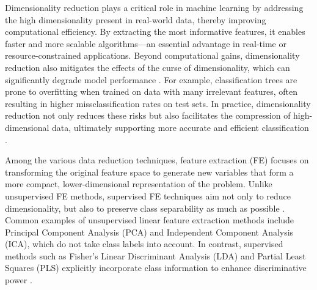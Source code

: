 \documentclass[11pt,a4paper]{article}
\begin{document}
Dimensionality reduction plays a critical role in machine learning by addressing the high dimensionality present in real-world data, thereby improving computational efficiency. By extracting the most informative features, it enables faster and more scalable algorithms---an essential advantage in real-time or resource-constrained applications.
Beyond computational gains, dimensionality reduction also mitigates the effects of the curse of dimensionality, which can significantly degrade model performance \citep{hu2024tackling}. For example, classification trees are prone to overfitting when trained on data with many irrelevant features, often resulting in higher missclassification rates on test sets.
In practice, dimensionality reduction not only reduces these risks but also facilitates the compression of high-dimensional data, ultimately supporting more accurate and efficient classification \citep{garcia2023evolutionary}.

Among the various data reduction techniques, feature extraction (FE) focuses on transforming the original feature space to generate new variables that form a more compact, lower-dimensional representation of the problem. Unlike unsupervised FE methods, supervised FE techniques aim not only to reduce dimensionality, but also to preserve class separability as much as possible \citep{fukunaga2013introduction}.
Common examples of unsupervised linear feature extraction methods include Principal Component Analysis (PCA) and Independent Component Analysis (ICA), which do not take class labels into account. In contrast, supervised methods such as Fisher's Linear Discriminant Analysis (LDA) and Partial Least Squares (PLS) explicitly incorporate class information to enhance discriminative power \citep{james2013introduction}.
\end{document}
